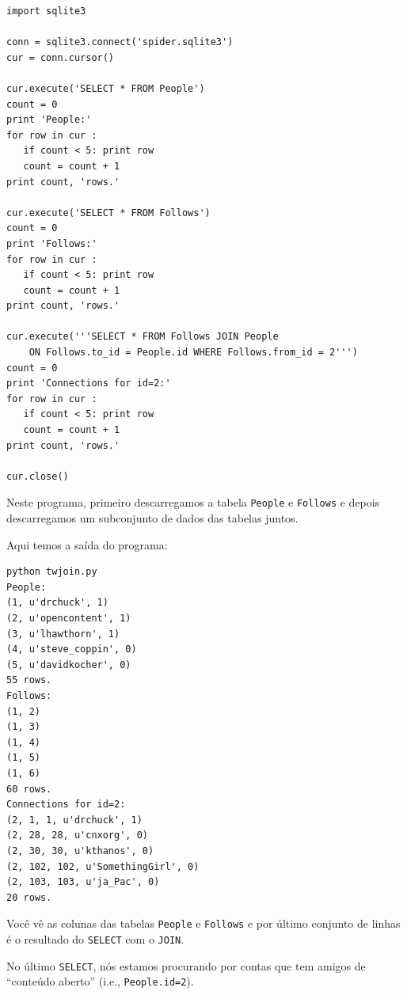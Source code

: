 \beforeverb
\begin{verbatim}
import sqlite3

conn = sqlite3.connect('spider.sqlite3')
cur = conn.cursor()

cur.execute('SELECT * FROM People')
count = 0
print 'People:'
for row in cur :
   if count < 5: print row
   count = count + 1
print count, 'rows.'

cur.execute('SELECT * FROM Follows')
count = 0
print 'Follows:'
for row in cur :
   if count < 5: print row
   count = count + 1
print count, 'rows.'

cur.execute('''SELECT * FROM Follows JOIN People 
    ON Follows.to_id = People.id WHERE Follows.from_id = 2''')
count = 0
print 'Connections for id=2:'
for row in cur :
   if count < 5: print row
   count = count + 1
print count, 'rows.'

cur.close()
\end{verbatim}
\afterverb
%

%
Neste programa, primeiro descarregamos a tabela {\tt People} e {\tt Follows} e
depois descarregamos um subconjunto de dados das tabelas juntos.


Aqui temos a saída do programa:

\beforeverb
\begin{verbatim}
python twjoin.py 
People:
(1, u'drchuck', 1)
(2, u'opencontent', 1)
(3, u'lhawthorn', 1)
(4, u'steve_coppin', 0)
(5, u'davidkocher', 0)
55 rows.
Follows:
(1, 2)
(1, 3)
(1, 4)
(1, 5)
(1, 6)
60 rows.
Connections for id=2:
(2, 1, 1, u'drchuck', 1)
(2, 28, 28, u'cnxorg', 0)
(2, 30, 30, u'kthanos', 0)
(2, 102, 102, u'SomethingGirl', 0)
(2, 103, 103, u'ja_Pac', 0)
20 rows.
\end{verbatim}
\afterverb
%

%
Você vê as colunas das tabelas {\tt People} e {\tt Follows} e por último
conjunto de linhas é o resultado do {\tt SELECT} com o {\tt JOIN}.


No último {\tt SELECT}, nós estamos procurando por contas que tem amigos de
``conteúdo aberto'' (i.e., {\tt People.id=2}).

